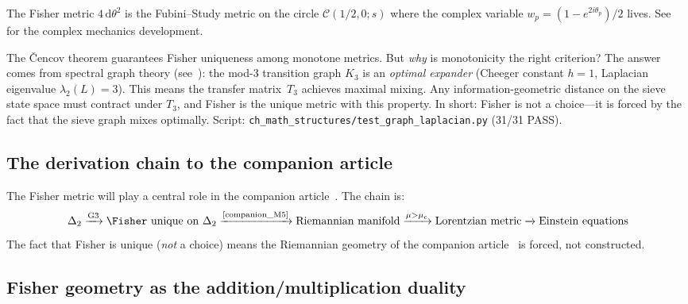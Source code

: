 \documentclass[12pt,a4paper]{article}
\begin{document}
\begin{remark}
The Fisher metric $4\,\mathrm{d}\theta^2$ is the Fubini--Study metric on
the circle $\mathcal{C}(1/2, 0; s)$ where the complex variable
$w_p = (1 - e^{2i\theta_p})/2$ lives.
See~\cite{companion_M4} for the complex mechanics development.
\end{remark}

\begin{remark}
\label{rem:expander_fisher}
The \v{C}encov theorem guarantees Fisher uniqueness among monotone
metrics. But \emph{why} is monotonicity the right criterion?
The answer comes from spectral graph theory
(see~\cite{companion_M4}): the mod-3 transition graph $K_3$
is an \emph{optimal expander} (Cheeger constant $h = 1$, Laplacian
eigenvalue $\lambda_2(L) = 3$). This means the transfer matrix~$T_3$
achieves maximal mixing. Any information-geometric distance on the
sieve state space must contract under $T_3$, and Fisher is the unique
metric with this property. In short: Fisher is not a choice---it is
forced by the fact that the sieve graph mixes optimally.
Script: \texttt{ch\_math\_structures/test\_graph\_laplacian.py} (31/31 PASS).
\end{remark}

\subsection{The derivation chain to the companion article~\cite{companion_physics}}
\label{sec:ch5_chain}

The Fisher metric will play a central role in the companion article~\cite{companion_physics}. The chain is:
\[
  \Delta_2 \xrightarrow{\text{G3}} \Fisher \text{ unique on } \Delta_2
  \xrightarrow{\text{\cite{companion_M5}}} \text{Riemannian manifold}
  \xrightarrow{\mu > \mu_c} \text{Lorentzian metric}
  \xrightarrow{} \text{Einstein equations}
\]
The fact that Fisher is unique (\emph{not} a choice) means the
Riemannian geometry of the companion article~\cite{companion_physics} is forced, not constructed.

\subsection{Fisher geometry as the addition/multiplication duality}
\label{sec:ch5_add_mult}
\end{document}

